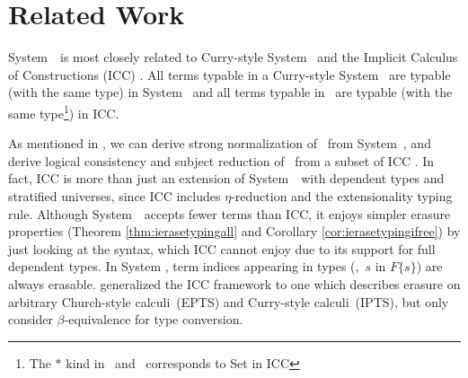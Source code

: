 \section{Related Work} \label{sec:relwork}
System~\Fi\ is most closely related to
Curry-style System~\Fw \cite{AbeMatUus03,AbeMatUus05,GHR93}
and the Implicit Calculus of Constructions (ICC) \cite{Miquel01}.
All terms typable in a Curry-style System \Fw\ are typable (with the same type) in System \Fi\ 
and all terms typable in \Fi\ are typable (with the same type\footnote{The $*$ kind in \Fw\ and \Fi\ corresponds
	to \textsf{Set} in ICC}) in ICC.

As mentioned in \label{ssec:sn}, we can derive strong normalization of \Fi\ 
from System~\Fw, and derive logical consistency and subject reduction of \Fi\ 
from a subset of ICC \cite{Miquel00}.  In fact, ICC is more than just
an extension of System~\Fi\ with dependent types and stratified universes,
since ICC includes $\eta$-reduction and the extensionality typing rule.
Although
System~\Fi\ accepts fewer terms than ICC, it enjoys simpler
erasure properties (Theorem \ref{thm:ierasetypingall} and
Corollary \ref{cor:ierasetypingifree}) by just looking at the syntax,
which ICC cannot enjoy due to its support for full dependent types.
In System \Fi, term indices
appearing in types (\eg,~$s$ in $F\{s\}$) are always erasable.
\citet{LingerS08} generalized the ICC framework to one which describes
erasure on arbitrary Church-style calculi~(EPTS) and Curry-style
calculi~(IPTS), but only consider $\beta$-equivalence for type conversion.


